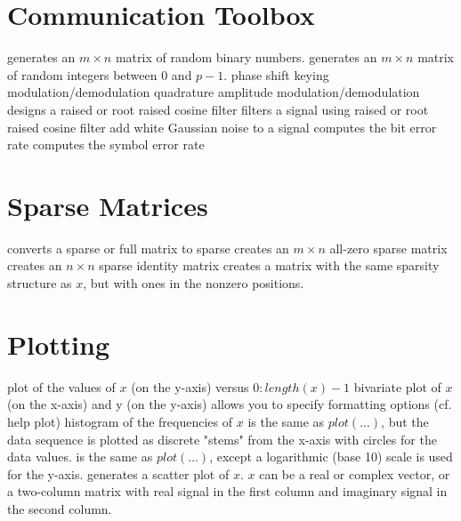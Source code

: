 \section{Communication Toolbox}{}
	{generates an $m \times n$ matrix of random binary numbers.}
	{generates an $m \times n$ matrix of random integers between $0$ and $p-1$.}
	{phase shift keying modulation/demodulation}
	{quadrature amplitude modulation/demodulation}
	{designs a raised or root raised cosine filter}
	{filters a signal using raised or root raised cosine filter}
	{add white Gaussian noise to a signal}
	{computes the bit error rate}
	{computes the symbol error rate}

\section{Sparse Matrices}{}
	{converts a sparse or full matrix to sparse}
	{creates an $m \times n$ all-zero sparse matrix}
	{creates an $n \times n$ sparse identity matrix}
	{creates a matrix with the same sparsity structure as $x$, but with ones in the nonzero positions.}

\section{Plotting}{}
	{plot of the values of $x$ (on the y-axis) versus $0:length(x)-1$}
	{bivariate plot of $x$ (on the x-axis) and y (on the y-axis)}
	{allows you to specify formatting options (cf. help plot)}
	{histogram of the frequencies of $x$}
	{is the same as $plot(...)$, but the data sequence is plotted as discrete "stems" from the x-axis with circles for the data values.}
	{is the same as $plot(...)$, except a logarithmic (base 10) scale is used for the y-axis.}
	{generates a scatter plot of $x$. $x$ can be a real or complex vector, or a two-column matrix with real signal in the first column and imaginary signal in the second column.}

